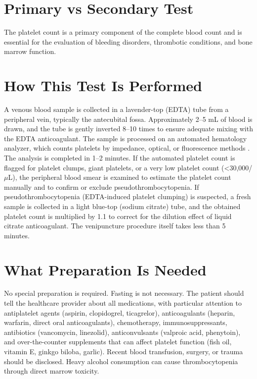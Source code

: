 \section*{Primary vs Secondary Test}
The platelet count is a primary component of the complete blood count and is essential for the evaluation of bleeding disorders, thrombotic conditions, and bone marrow function.

\section*{How This Test Is Performed}
A venous blood sample is collected in a lavender-top (EDTA) tube from a peripheral vein, typically the antecubital fossa. Approximately 2--5 mL of blood is drawn, and the tube is gently inverted 8--10 times to ensure adequate mixing with the EDTA anticoagulant. The sample is processed on an automated hematology analyzer, which counts platelets by impedance, optical, or fluorescence methods \cite{fischbach2023manual}. The analysis is completed in 1--2 minutes. If the automated platelet count is flagged for platelet clumps, giant platelets, or a very low platelet count (<30,000/$\mu$L), the peripheral blood smear is examined to estimate the platelet count manually and to confirm or exclude pseudothrombocytopenia. If pseudothrombocytopenia (EDTA-induced platelet clumping) is suspected, a fresh sample is collected in a light blue-top (sodium citrate) tube, and the obtained platelet count is multiplied by 1.1 to correct for the dilution effect of liquid citrate anticoagulant. The venipuncture procedure itself takes less than 5 minutes.

\section*{What Preparation Is Needed}
No special preparation is required. Fasting is not necessary. The patient should tell the healthcare provider about all medications, with particular attention to antiplatelet agents (aspirin, clopidogrel, ticagrelor), anticoagulants (heparin, warfarin, direct oral anticoagulants), chemotherapy, immunosuppressants, antibiotics (vancomycin, linezolid), anticonvulsants (valproic acid, phenytoin), and over-the-counter supplements that can affect platelet function (fish oil, vitamin E, ginkgo biloba, garlic). Recent blood transfusion, surgery, or trauma should be disclosed. Heavy alcohol consumption can cause thrombocytopenia through direct marrow toxicity.

